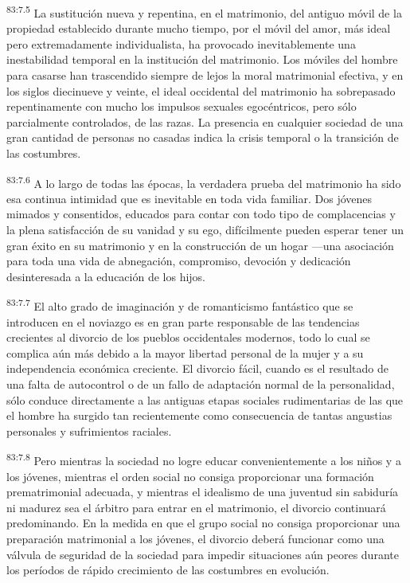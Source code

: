 \par
\textsuperscript{83:7.5} La sustitución nueva y repentina, en el matrimonio, del antiguo móvil de la propiedad establecido durante mucho tiempo, por el móvil del amor, más ideal pero extremadamente individualista, ha provocado inevitablemente una inestabilidad temporal en la institución del matrimonio. Los móviles del hombre para casarse han trascendido siempre de lejos la moral matrimonial efectiva, y en los siglos diecinueve y veinte, el ideal occidental del matrimonio ha sobrepasado repentinamente con mucho los impulsos sexuales egocéntricos, pero sólo parcialmente controlados, de las razas. La presencia en cualquier sociedad de una gran cantidad de personas no casadas indica la crisis temporal o la transición de las costumbres.

\par
\textsuperscript{83:7.6} A lo largo de todas las épocas, la verdadera prueba del matrimonio ha sido esa continua intimidad que es inevitable en toda vida familiar. Dos jóvenes mimados y consentidos, educados para contar con todo tipo de complacencias y la plena satisfacción de su vanidad y su ego, difícilmente pueden esperar tener un gran éxito en su matrimonio y en la construcción de un hogar ---una asociación para toda una vida de abnegación, compromiso, devoción y dedicación desinteresada a la educación de los hijos.

\par
\textsuperscript{83:7.7} El alto grado de imaginación y de romanticismo fantástico que se introducen en el noviazgo es en gran parte responsable de las tendencias crecientes al divorcio de los pueblos occidentales modernos, todo lo cual se complica aún más debido a la mayor libertad personal de la mujer y a su independencia económica creciente. El divorcio fácil, cuando es el resultado de una falta de autocontrol o de un fallo de adaptación normal de la personalidad, sólo conduce directamente a las antiguas etapas sociales rudimentarias de las que el hombre ha surgido tan recientemente como consecuencia de tantas angustias personales y sufrimientos raciales.

\par
\textsuperscript{83:7.8} Pero mientras la sociedad no logre educar convenientemente a los niños y a los jóvenes, mientras el orden social no consiga proporcionar una formación prematrimonial adecuada, y mientras el idealismo de una juventud sin sabiduría ni madurez sea el árbitro para entrar en el matrimonio, el divorcio continuará predominando. En la medida en que el grupo social no consiga proporcionar una preparación matrimonial a los jóvenes, el divorcio deberá funcionar como una válvula de seguridad de la sociedad para impedir situaciones aún peores durante los períodos de rápido crecimiento de las costumbres en evolución.


